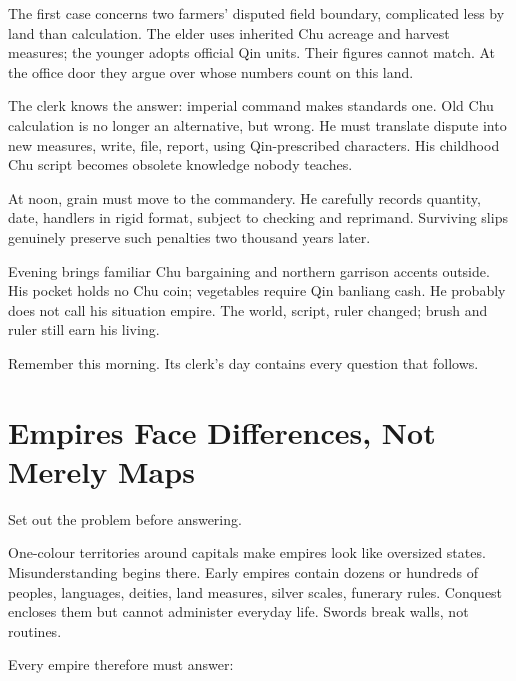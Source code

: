 The first case concerns two farmers' disputed field boundary, complicated less by land than calculation. The elder uses inherited Chu acreage and harvest measures; the younger adopts official Qin units. Their figures cannot match. At the office door they argue over whose numbers count on this land.

The clerk knows the answer: imperial command makes standards one. Old Chu calculation is no longer an alternative, but wrong. He must translate dispute into new measures, write, file, report, using Qin-prescribed characters. His childhood Chu script becomes obsolete knowledge nobody teaches.

At noon, grain must move to the commandery. He carefully records quantity, date, handlers in rigid format, subject to checking and reprimand. Surviving slips genuinely preserve such penalties two thousand years later.

Evening brings familiar Chu bargaining and northern garrison accents outside. His pocket holds no Chu coin; vegetables require Qin banliang cash. He probably does not call his situation empire. The world, script, ruler changed; brush and ruler still earn his living.

Remember this morning. Its clerk's day contains every question that follows.

\section[Empires Face Differences, Not Maps]{Empires Face Differences, Not Merely Maps}
Set out the problem before answering.

One-colour territories around capitals make empires look like oversized states. Misunderstanding begins there. Early empires contain dozens or hundreds of peoples, languages, deities, land measures, silver scales, funerary rules. Conquest encloses them but cannot administer everyday life. Swords break walls, not routines.

Every empire therefore must answer:


